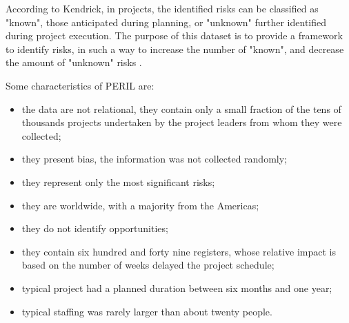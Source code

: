 According to Kendrick, in projects, the identified risks can be classified as "known", those anticipated during planning, or "unknown" further identified during project execution. The purpose of this dataset is to provide a framework to identify risks, in such a way to increase the number of "known", and decrease the amount of "unknown" risks \cite{kendrick2003identifying}.

Some characteristics of PERIL are: 
\begin{itemize}
\item the data are not relational, they contain only a small fraction of the tens of thousands projects undertaken by the project leaders from whom they were collected;
\item they present bias, the information was not collected randomly;
\item they represent only the most significant risks;
\item they are worldwide, with a majority from the Americas;
\item they do not identify opportunities; 
\item they contain six hundred and forty nine registers, whose relative impact is based on the number of weeks delayed the project schedule;
\item typical project had a planned duration between six months and one year;
\item typical staffing was rarely larger than about twenty people.
\end{itemize}

